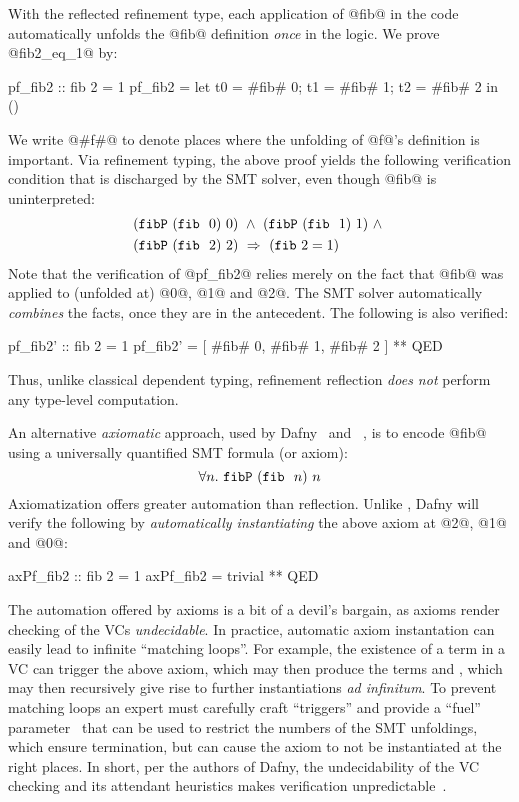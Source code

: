 %
With the reflected refinement type,
each application of @fib@ in the code
automatically unfolds the @fib@ definition
\textit{once} in the logic.
%
We prove @fib2_eq_1@ by:
%
\begin{code}
  pf_fib2 :: { fib 2 = 1 }
  pf_fib2 = let { t0 = #fib# 0; t1 = #fib# 1;
                  t2 = #fib# 2 } in  ()
\end{code}
%
We write @#f#@ to denote places where the
unfolding of @f@'s definition is important.
%
Via refinement typing, the above proof yields the
following verification condition that is
discharged by the SMT solver, even though @fib@
is uninterpreted:
%
\begin{align*}
   & (\fibdef\ (\fib\ 0)\ 0) \ \wedge\ (\fibdef\ (\fib\ 1)\ 1) \ \wedge\ \\
   & (\fibdef\ (\fib\ 2)\ 2) \  \Rightarrow\ (\fib{2} = 1)
\end{align*}
%
Note that the verification of @pf_fib2@ relies
merely on the fact that @fib@ was applied
to (\ie unfolded at) @0@, @1@ and @2@.
%
The SMT solver automatically \emph{combines}
the facts, once they are in the antecedent.
The following is also verified:
%
\begin{code}
  pf_fib2' :: { fib 2 = 1 }
  pf_fib2' = [ #fib# 0, #fib# 1, #fib# 2 ] ** QED
\end{code}
%
%
Thus, unlike classical dependent typing, refinement
reflection \emph{does not} perform any type-level
computation.

%
An alternative \emph{axiomatic} approach,
used by Dafny~\citep{dafny} and
\fstar~\citep{fstar},
is to encode @fib@ using a universally
quantified SMT formula (or axiom):
$$\forall n.\ \texttt{fibP}\ (\texttt{fib}\ {\ }n)\ n$$
%
Axiomatization offers greater automation than
reflection. Unlike \toolname, Dafny
will verify the following by
\emph{automatically instantiating} the above
axiom at @2@, @1@ and @0@:
%
\begin{code}
  axPf_fib2 :: { fib 2 = 1 }
  axPf_fib2 = trivial ** QED
\end{code}

The automation offered by axioms is a bit of a
devil's bargain, as axioms render checking of
the VCs \emph{undecidable}.
%
In practice, automatic axiom instantation can
easily lead to infinite ``matching loops''.
%
For example, the existence of a term  in a VC
can trigger the above axiom, which may then produce
the terms  and , which may then
recursively give rise to further instantiations
\emph{ad infinitum}.
%
To prevent matching loops an expert must carefully
craft ``triggers'' and provide a ``fuel''
parameter~\citep{Amin2014ComputingWA} that can be
used to restrict the numbers of the SMT unfoldings,
which ensure termination, but can cause the axiom
to not be instantiated at the right places.
%
In short, per the authors of Dafny, the
undecidability of the VC checking and its
attendant heuristics makes verification
unpredictable~\citep{Leino16}.

